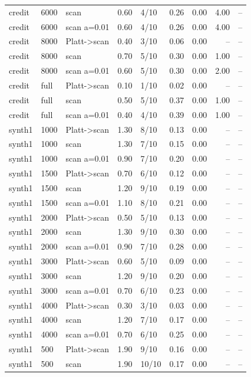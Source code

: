 \begin{tabular}{lllrlrrrr}
credit & 6000 & scan & 0.60 & 4/10 & 0.26 & 0.00 & 4.00 & -- \\
credit & 6000 & scan a=0.01 & 0.60 & 4/10 & 0.26 & 0.00 & 4.00 & -- \\
credit & 8000 & Platt->scan & 0.40 & 3/10 & 0.06 & 0.00 & -- & -- \\
credit & 8000 & scan & 0.70 & 5/10 & 0.30 & 0.00 & 1.00 & -- \\
credit & 8000 & scan a=0.01 & 0.60 & 5/10 & 0.30 & 0.00 & 2.00 & -- \\
credit & full & Platt->scan & 0.10 & 1/10 & 0.02 & 0.00 & -- & -- \\
credit & full & scan & 0.50 & 5/10 & 0.37 & 0.00 & 1.00 & -- \\
credit & full & scan a=0.01 & 0.40 & 4/10 & 0.39 & 0.00 & 1.00 & -- \\
synth1 & 1000 & Platt->scan & 1.30 & 8/10 & 0.13 & 0.00 & -- & -- \\
synth1 & 1000 & scan & 1.30 & 7/10 & 0.15 & 0.00 & -- & -- \\
synth1 & 1000 & scan a=0.01 & 0.90 & 7/10 & 0.20 & 0.00 & -- & -- \\
synth1 & 1500 & Platt->scan & 0.70 & 6/10 & 0.12 & 0.00 & -- & -- \\
synth1 & 1500 & scan & 1.20 & 9/10 & 0.19 & 0.00 & -- & -- \\
synth1 & 1500 & scan a=0.01 & 1.10 & 8/10 & 0.21 & 0.00 & -- & -- \\
synth1 & 2000 & Platt->scan & 0.50 & 5/10 & 0.13 & 0.00 & -- & -- \\
synth1 & 2000 & scan & 1.30 & 9/10 & 0.30 & 0.00 & -- & -- \\
synth1 & 2000 & scan a=0.01 & 0.90 & 7/10 & 0.28 & 0.00 & -- & -- \\
synth1 & 3000 & Platt->scan & 0.60 & 5/10 & 0.09 & 0.00 & -- & -- \\
synth1 & 3000 & scan & 1.20 & 9/10 & 0.20 & 0.00 & -- & -- \\
synth1 & 3000 & scan a=0.01 & 0.70 & 6/10 & 0.23 & 0.00 & -- & -- \\
synth1 & 4000 & Platt->scan & 0.30 & 3/10 & 0.03 & 0.00 & -- & -- \\
synth1 & 4000 & scan & 1.20 & 7/10 & 0.17 & 0.00 & -- & -- \\
synth1 & 4000 & scan a=0.01 & 0.70 & 6/10 & 0.25 & 0.00 & -- & -- \\
synth1 & 500 & Platt->scan & 1.90 & 9/10 & 0.16 & 0.00 & -- & -- \\
synth1 & 500 & scan & 1.90 & 10/10 & 0.17 & 0.00 & -- & -- \\

\end{tabular}
